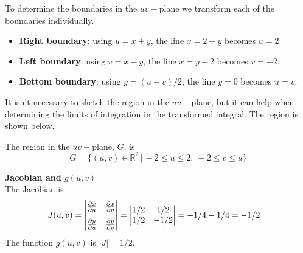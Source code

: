 {    To determine the boundaries in the $uv-$plane we transform each of the boundaries individually. 
    \begin{itemize}
        \item \textbf{Right boundary}: using $u=x+y$, the line $x=2-y$ becomes $u=2$. 
        \item \textbf{Left boundary}: using $v=x-y$, the line $x=y-2$ becomes $v=-2$. 
        \item \textbf{Bottom boundary}: using $y=(u-v)/2$, the line $y=0$ becomes $u=v$.
    \end{itemize}
    It isn't necessary to sketch the region in the $uv-$plane, but it can help when determining the limits of integration in the transformed integral. The region is shown below. 
    \begin{center}     
    \end{center}         
    The region in the $uv-$plane, $G$, is 
    $$G = \{(u,v) \in \mathbb R^2 \, | \, -2 \le u \le 2, \ -2 \le v \le u \}$$
    
    \textbf{Jacobian and $g(u,v)$ }\\
    The Jacobian is
    \begin{align}
        J(u,v) 
        & = \begin{vmatrix} \frac{\partial x}{\partial u} & \frac{\partial x}{\partial v} \\[8pt] \frac{\partial y}{\partial u} & \frac{\partial y}{\partial v} \end{vmatrix} 
        = \begin{vmatrix} 1/2 & 1/2 \\ 1/2 & -1/2 \end{vmatrix} 
        = -1/4 - 1/4 = - 1/2
    \end{align}      
    The function $g(u,v)$ is $|J| = 1/2$.    
    \vspace{12pt}
    
}
